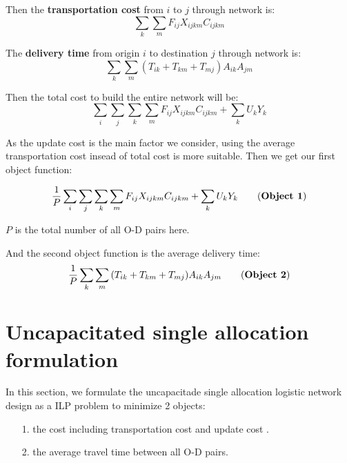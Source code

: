 \documentclass{llncs}
\begin{document}
	Then the \textbf{transportation cost} from $i$ to $j$ through network is:
	\begin{equation}
		\sum_{k}\sum_{m}F_{ij}  X_{ijkm} C_{ijkm}
	\end{equation}
	
	The \textbf{delivery time} from origin $i$ to destination $j$ through network is:
	\begin{equation}
	\sum_{k}\sum_{m}{(T_{ik}+ T_{km}+ T_{mj} ) A_{ik} A_{jm}}
	\end{equation}
	
	Then the total cost to build the entire network will be:
	\begin{equation}
		\sum_{i}\sum_{j}\sum_{k}\sum_{m}F_{ij}  X_{ijkm} C_{ijkm} + \sum_{k}U_k Y_{k}
	\end{equation}
	
	As the update cost is the main factor we consider, using the average transportation cost insead of total cost is more suitable. Then we get our first object function:
	
	\begin{equation}
		\frac{1}{P}\sum_{i}\sum_{j}\sum_{k}\sum_{m}F_{ij}  X_{ijkm} C_{ijkm} + \sum_{k}U_k Y_{k} \tag{\textbf{Object 1}}
	\end{equation}
	
	$P$ is the total number of all O-D pairs here.
	
	And the second object function is the average delivery time:
		\begin{equation}
		\frac{1}{P} \sum_{k}\sum_{m}{(T_{ik}+ T_{km}+ T_{mj} ) A_{ik} A_{jm}} \tag{\textbf{Object 2}}
	\end{equation}
	
\section{Uncapacitated single allocation formulation}
	In this section, we formulate the uncapacitade single allocation logistic network design as a ILP problem to minimize 2 objects:
	\begin{itemize}
		\item[1.] the cost including transportation cost and update cost .
		\item[2.] the average travel time between all O-D pairs.
	\end{itemize}
	
\end{document}
